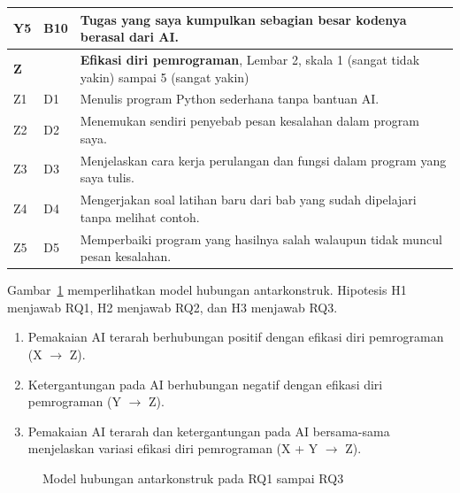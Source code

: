 \begin{table}[H]
\begin{tabularx}{\textwidth}{llX}
    \hline
    Y5 & B10 & Tugas yang saya kumpulkan sebagian besar kodenya berasal dari AI. \\
    \hline
    \textbf{Z} & & \textbf{Efikasi diri pemrograman}, Lembar 2, skala 1 (sangat tidak yakin) sampai 5 (sangat yakin) \\
    \hline
    Z1 & D1 & Menulis program Python sederhana tanpa bantuan AI. \\
    \hline
    Z2 & D2 & Menemukan sendiri penyebab pesan kesalahan dalam program saya. \\
    \hline
    Z3 & D3 & Menjelaskan cara kerja perulangan dan fungsi dalam program yang saya tulis. \\
    \hline
    Z4 & D4 & Mengerjakan soal latihan baru dari bab yang sudah dipelajari tanpa melihat contoh. \\
    \hline
    Z5 & D5 & Memperbaiki program yang hasilnya salah walaupun tidak muncul pesan kesalahan. \\
    \hline
  \end{tabularx}
\end{table}

Gambar~\ref{fig:b16-model} memperlihatkan model hubungan antarkonstruk. Hipotesis H1 menjawab RQ1, H2 menjawab RQ2, dan H3 menjawab RQ3.

\begin{enumerate}
  \item[H1.] Pemakaian AI terarah berhubungan positif dengan efikasi diri pemrograman (X $\rightarrow$ Z).
  \item[H2.] Ketergantungan pada AI berhubungan negatif dengan efikasi diri pemrograman (Y $\rightarrow$ Z).
  \item[H3.] Pemakaian AI terarah dan ketergantungan pada AI bersama-sama menjelaskan variasi efikasi diri pemrograman (X + Y $\rightarrow$ Z).
\end{enumerate}

\begin{figure}[H]
  \centering
  \caption{Model hubungan antarkonstruk pada RQ1 sampai RQ3}
  \label{fig:b16-model}
\end{figure}

